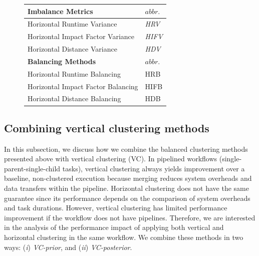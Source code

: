 \documentclass[final,5p,times,twocolumn]{elsarticle}
\begin{document}
\begin{figure}[htb]
	\centering
	\small
	\begin{tabular}{l|l}
		\hline
		\textbf{Imbalance Metrics} & $abbr.$   \\
		\hline
		Horizontal Runtime Variance & \emph{HRV}   \\ 
		Horizontal Impact Factor Variance & \emph{HIFV} \\ 
		Horizontal Distance Variance & \emph{HDV}  \\ 
		\hline
		\textbf{Balancing Methods} & $abbr.$  \\
		\hline
		Horizontal Runtime Balancing & HRB   \\ 
		Horizontal Impact Factor Balancing & HIFB\\ 
		Horizontal Distance Balancing & HDB \\ 
		\hline
	\end{tabular}
	\label{tab:2}
\end{figure}



\subsection{Combining vertical clustering methods}

In this subsection, we discuss how we combine the balanced clustering methods presented above with vertical clustering (VC).
In pipelined workflows (single-parent-single-child tasks), vertical clustering always yields improvement over a baseline, non-clustered execution because merging reduces system overheads and data transfers within the pipeline. Horizontal clustering does not have the same guarantee since its performance depends on the comparison of system overheads and task durations. However, vertical clustering has limited performance improvement if the workflow does not have pipelines. Therefore, we are interested in the analysis of the performance impact of applying both vertical and horizontal clustering in the same workflow. We combine these methods in two ways: (\emph{i}) \emph{VC-prior}, and (\emph{ii}) \emph{VC-posterior}.
\end{document}
